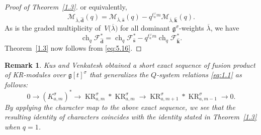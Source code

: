 \documentclass[10pt,a4paper]{amsart}
\numberwithin{equation}{section}
\DeclareMathOperator{\KR}{KR}
\DeclareMathOperator{\ch}{ch}
\newtheorem*{remark*}{Remark}
\begin{document}
\begin{proof}[Proof of Theorem~\ref{1.3}]
or equivalently,
\[
\mathcal{M}_{\overline{\lambda},\widehat{\mathbf{d}}}(q)
=\mathcal{M}_{\overline{\lambda},\widehat{\mathbf{s}}}(q)
-q^{t_a^{\vee}m}\mathcal{M}_{\overline{\lambda},\widehat{\mathbf{k}}}(q).
\]
As  is the graded multiplicity of~$V\bigl(\overline{\lambda}\bigr)$ for all dominant $\mathfrak{g}^{\sigma}$-weights $\overline{\lambda}$, we have
\begin{equation}\label{eq:5.16}
\ch_q\mathcal{F}_{\widehat{\mathbf{d}}}^*
=\ch_q\mathcal{F}_{\widehat{\mathbf{s}}}^*
-q^{t_a^{\vee}m}\ch_q\mathcal{F}_{\widehat{\mathbf{k}}}^*.
\end{equation}
Theorem~\ref{1.3} now follows from \eqref{eq:5.16}.
\end{proof}


\begin{remark*}
Kus and Venkatesh \cite[Proposition 7.3]{KV16} obtained a short exact sequence of fusion product of KR-modules over $\mathfrak{g}[t]^{\sigma}$ that generalizes the  $Q$-system relations \eqref{eq:1.1} as follows:
\begin{equation*}
0\longrightarrow(K_{a,m}^{\sigma})^*\longrightarrow\KR_{a,m}^{\sigma}*\KR_{a,m}^{\sigma}\longrightarrow\KR_{a,m+1}^{\sigma}*\KR_{a,m-1}^{\sigma}\longrightarrow0.
\end{equation*}
By applying the character map to the above exact sequence, we see that the resulting identity of characters coincides with the identity stated in Theorem~\ref{1.3} when $q=1$.
\end{remark*}
\end{document}
